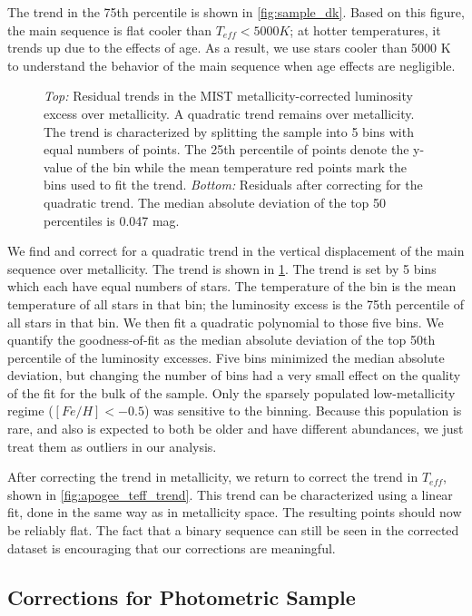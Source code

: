 \documentclass[manuscript]{aastex6}
\newcommand{\Teff}{\ensuremath{T_{eff}}}
\begin{document}
The trend in the 75th percentile is shown in \cref{fig:sample_dk}. Based on 
this figure, the main sequence is flat cooler than \(\Teff < 5000 K\); at
hotter temperatures, it trends up due to the effects of age. As a result, we 
use stars cooler than 5000 K to understand the behavior of the main sequence 
when age effects are negligible.

\begin{figure}[htb]
    \centering
    \caption{\emph{Top:} Residual trends in the MIST metallicity-corrected luminosity 
    excess over metallicity. A quadratic trend remains over metallicity. The
    trend is characterized by splitting the sample into 5 bins with equal
    numbers of points.  The 25th percentile of points denote the y-value of the
    bin while the mean temperature red points mark the bins used to fit the trend. \emph{Bottom:} Residuals after
correcting for the quadratic trend. The median absolute deviation of the top 50
percentiles is 0.047 mag.}
    \label{fig:met_trend}
\end{figure}

We find and correct for a quadratic trend in the vertical displacement of the
main sequence over metallicity. The trend is shown in \cref{fig:met_trend}.
The trend is set by 5 bins which each have equal numbers of stars. The
temperature of the bin is the mean temperature of all stars in that bin; the
luminosity excess is the 75th percentile of all stars in that bin. We then fit
a quadratic polynomial to those five bins. We quantify the goodness-of-fit as
the median absolute deviation of the top 50th percentile of the luminosity
excesses. Five bins minimized the median absolute deviation, but changing the
number of bins had a very small effect on the quality of the fit for the bulk
of the sample. Only the sparsely populated low-metallicity regime (\([Fe/H] <
-0.5\)) was sensitive to the binning. Because this population is rare, and also
is expected to both be older and have different abundances, we just treat them
as outliers in our analysis.

After correcting the trend in metallicity, we return to correct the trend in
\Teff{}, shown in \cref{fig:apogee_teff_trend}. This trend can be characterized
using a linear fit, done in the same way as in metallicity space. The resulting
points should now be reliably flat. The fact that a binary sequence can still
be seen in the corrected dataset is encouraging that our corrections are
meaningful.

\subsection{Corrections for Photometric Sample}
\end{document}
